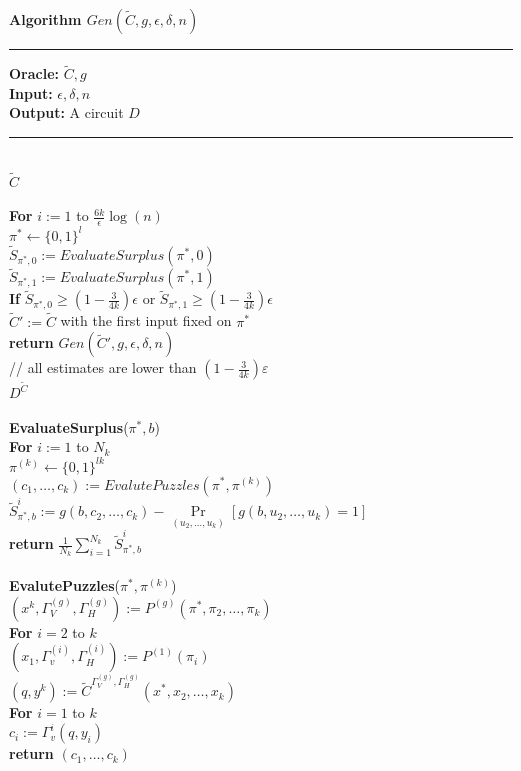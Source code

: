 \begin{codeblock}
  \textbf{Algorithm $Gen(\widetilde{C},g,\epsilon,\delta,n)$}
  \medskip

  \hrule

  \medskip

  \textbf{Oracle:} $\widetilde{C}, g$ \\
  \textbf{Input:}  $\epsilon, \delta, n$\\
  \textbf{Output:} A circuit $D$

  \medskip\hrule\medskip
  \If {} \then \\
  \IndI \return $\widetilde{C}$ \\ \\
  \textbf{For} $i:=1$ to $\frac{6k}{\epsilon}\log(n)$ \\
  \IndI $\pi^* \leftarrow \{0,1\}^{l}$\\
  \IndI $\widetilde{S}_{\pi^*,0} := EvaluateSurplus(\pi^*, 0)$\\
  \IndI $\widetilde{S}_{\pi^*,1} := EvaluateSurplus(\pi^*, 1)$\\
  \IndI \textbf{If} $\widetilde{S}_{\pi^*,0} \geq (1 - \frac{3}{4k}) \epsilon$ or $\widetilde{S}_{\pi^*,1} \geq (1 - \frac{3}{4k}) \epsilon$ \\
  \IndII $\widetilde{C}' := \widetilde{C}$ with the first input fixed on $\pi^*$\\
  \IndII\textbf{return} $Gen(\widetilde{C}', g, \epsilon, \delta, n)$ \\
  // all estimates are lower than $(1-\frac{3}{4k})\varepsilon$\\
  \return $D^{\widetilde{C}}$ \\
  \\
  \textbf{EvaluateSurplus}($\pi^*, b$) \\
  \IndI \textbf{For} $i:=1$ to $N_k$ \\
  \IndII $\pi^{(k)} \leftarrow \{0,1\}^{lk}$\\
  \IndII $(c_1, \dots, c_k) := EvalutePuzzles(\pi^*, \pi^{(k)})$\\
  \IndII $\widetilde{S}_{\pi^*,b}^i := g(b, c_2, \dots, c_k) - \underset{(u_2, \dots, u_k)}{\Pr}[g(b, u_2, \dots, u_k) = 1] $\\
  \IndI \textbf{return} $\frac{1}{N_k} \sum_{i=1}^{N_k} \widetilde{S}_{\pi^*,b}^i$\\
  \\
  \textbf{EvalutePuzzles}($\pi^*, \pi^{(k)}$)\\
  \IndI $(x^{k}, \Gamma_V^{(g)}, \Gamma_H^{(g)}) := P^{(g)}(\pi^*, \pi_2, \dots, \pi_k)$ \\
  \IndI \textbf{For} $i=2$ to $k$\\
  \IndII $(x_1, \Gamma_v^{(i)}, \Gamma_H^{(i)}) := P^{(1)}(\pi_i)$\\
  \IndI $(q,y^{k}) := \widetilde{C}^{\Gamma_V^{(g)}, \Gamma_H^{(g)}}(x^*, x_2, \dots, x_k)$\\
  \IndI \textbf{For} $i=1$ to $k$\\
  \IndII $c_i := \Gamma_v^{i}(q, y_i)$\\
  \IndI \textbf{return} $(c_1, \dots, c_k)$\\
\end{codeblock}
